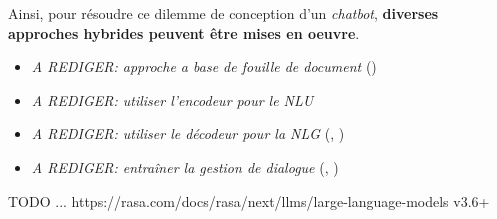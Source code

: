 		Ainsi, pour résoudre ce dilemme de conception d'un \textit{chatbot}, \textbf{diverses approches hybrides peuvent être mises en oeuvre}.
		
		\begin{itemize}
			\item \textit{A REDIGER: approche a base de fouille de document} (\cite{zhang-etal:2016:neural-information-retrieval})
			\item \textit{A REDIGER: utiliser l'encodeur pour le NLU}
			\item \textit{A REDIGER: utiliser le décodeur pour la NLG} (\cite{gao-etal:2018:neural-approaches-conversational}, \cite{chen-etal:2017:survey-dialogue-systems})
			\item \textit{A REDIGER: entraîner la gestion de dialogue} (\cite{chen-etal:2017:survey-dialogue-systems}, \cite{brabra-etal:2022:dialogue-management-conversational})
		\end{itemize}
			
		\begin{leftBarExamples}
			TODO ...
			https://rasa.com/docs/rasa/next/llms/large-language-models v3.6+
		\end{leftBarExamples}